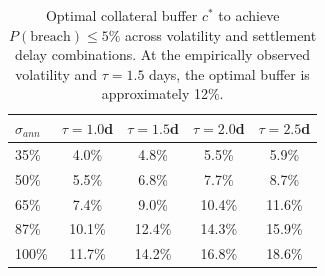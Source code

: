 \begin{table}[t]
\centering
\footnotesize
\caption{Optimal collateral buffer $c^*$ to achieve $P(\text{breach}) \leq 5\%$ across volatility and settlement delay combinations. At the empirically observed volatility and $\tau = 1.5$ days, the optimal buffer is approximately 12\%.}
\label{tab:optimal_buffer}
\begin{tabular}{lcccc}
\hline
$\sigma_{ann}$ & $\tau=1.0$d & $\tau=1.5$d & $\tau=2.0$d & $\tau=2.5$d \\
\hline
35\% & 4.0\% & 4.8\% & 5.5\% & 5.9\% \\
50\% & 5.5\% & 6.8\% & 7.7\% & 8.7\% \\
65\% & 7.4\% & 9.0\% & 10.4\% & 11.6\% \\
87\% & 10.1\% & 12.4\% & 14.3\% & 15.9\% \\
100\% & 11.7\% & 14.2\% & 16.8\% & 18.6\% \\
\hline
\end{tabular}
\end{table}
